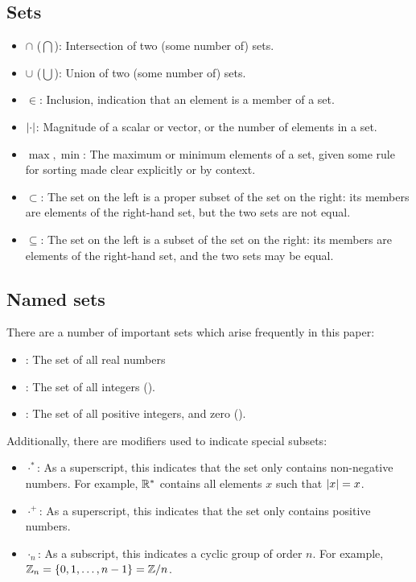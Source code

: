 \begin{appendix}
\section{Sets}
\begin{itemize}
\item $\cap$ ($\bigcap$): Intersection of two (some number of) sets.
\item $\cup$ ($\bigcup$): Union of two (some number of) sets.
\item $\in$: Inclusion, indication that an element is a member of a set.
\item $\left|\cdot\right|$: Magnitude of a scalar or vector, or the number of elements in a set.
\item $\max,\min$: The maximum or minimum elements of a set, given some rule for sorting made clear explicitly or by context.
\item $\subset$: The set on the left is a proper subset of the set on the right: its members are elements of the right-hand set, but the two sets are not equal.
\item $\subseteq$: The set on the left is a subset of the set on the right: its members are elements of the right-hand set, and the two sets may be equal.
\end{itemize}

\subsection{Named sets}
There are a number of important sets which arise frequently in this paper:
\begin{itemize}
\item \reals: The set of all real numbers
\item \integers: The set of all integers ().
\item \wholes: The set of all positive integers, and zero ().
\end{itemize}
Additionally, there are modifiers used to indicate special subsets:
\begin{itemize}
\item $\cdot^{*}$: As a superscript, this indicates that the set only contains non-negative numbers. For example, $\mathbb{R}^{*}$ contains all elements $x$ such that $\left|x\right|=x$.
\item $\cdot^{+}$: As a superscript, this indicates that the set only contains positive numbers. 
\item $\cdot_{n}$: As a subscript, this indicates a cyclic group of order $n$. For example, $\mathbb{Z}_{n}=\left\lbrace 0,1,\ldots,n-1 \right\rbrace=\mathbb{Z}/n$. 
\end{itemize}


\end{appendix}
